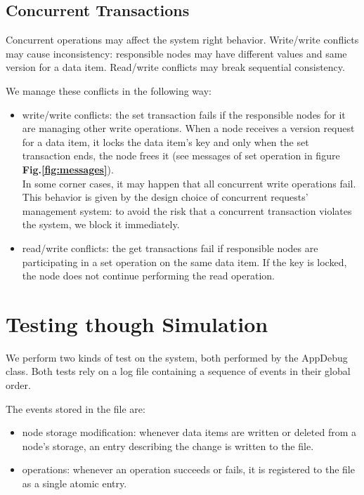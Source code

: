 \documentclass{article}
\begin{document}
\subsection{Concurrent Transactions}
Concurrent operations may affect the system right behavior. Write/write 
conflicts may cause inconsistency: responsible nodes may have different values 
and same version for a data item. Read/write conflicts may break sequential 
consistency.

We manage these conflicts in the following way:
\begin{itemize}
    \item write/write conflicts: the set transaction fails if the responsible 
    nodes for it are managing other write operations. When a node receives 
    a version request for a data item, it locks the data item's key and only 
    when the set transaction ends, the node frees it (see messages of set 
    operation in figure \textbf{Fig.\ref{fig:messages}}). 
    \\In some corner cases, it may happen that all concurrent write 
    operations fail. This behavior is given by the design choice of concurrent 
    requests' management system: to avoid the risk that a concurrent transaction 
    violates the system, we block it immediately.
    \item read/write conflicts: the get transactions fail if responsible 
    nodes are participating in a set operation on the same data item. If the 
    key is locked, the node does not continue performing the read operation.
\end{itemize}

\section{Testing though Simulation}
We perform two kinds of test on the system, both performed by the AppDebug class. 
Both tests rely on a log file containing a sequence of events in their global order.

The events stored in the file are:
\begin{itemize}
    \item node storage modification: whenever data items are written or deleted 
    from a node's storage, an entry describing the change is written to the file.
    \item operations: whenever an operation succeeds or fails, it is registered 
    to the file as a single atomic entry.
\end{itemize}
\end{document}
